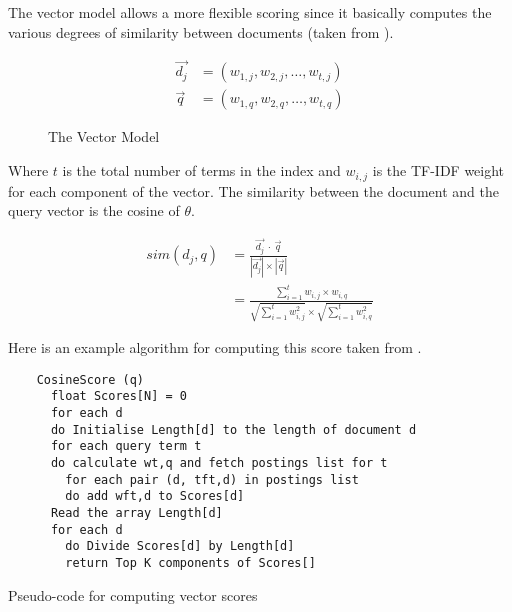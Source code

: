 The vector model allows a more flexible scoring since it basically computes the various degrees of similarity between documents (taken from \autocite[p.78]{Baeza-Yates2011}).

\begin{equation}
  \begin{split}
  \vec{d_j} &= (w_{1,j}, w_{2,j}, \ldots, w_{t,j})\\
  \vec{q} &= (w_{1,q}, w_{2,q}, \ldots, w_{t,q})
  \end{split}
  \label{eq:vector}
\end{equation}

\begin{figure}[htb] %
  \centering
\caption[Vector Model]{The Vector Model}
\label{fig:VM}
\end{figure}

Where $t$ is the total number of terms in the index and $w_{i,j}$ is the TF-IDF weight for each component of the vector. The similarity between the document and the query vector is the cosine of $\theta$.

\begin{equation}
  \begin{split}
  sim(d_j,q) &= \frac{\vec{d_j} \ \cdot \ \vec{q}}{|\vec{d_j}| \times |\vec{q}|}\\
  &= \frac{\sum_{i=1}^{t}w_{i,j} \times w_{i,q}}
  {\sqrt{\sum_{i=1}^{t}w_{i,j}^{2}} \times \sqrt{\sum_{i=1}^{t}w_{i,q}^{2}}}
  \end{split}
  \label{eq:sim2}
\end{equation}

Here is an example algorithm for computing this score taken from \autocite[p.125]{Manning2009}.

\begin{listing}[htb]
  \begin{verbatim}
    CosineScore (q)
      float Scores[N] = 0
      for each d
      do Initialise Length[d] to the length of document d
      for each query term t
      do calculate wt,q and fetch postings list for t
        for each pair (d, tft,d) in postings list
        do add wft,d to Scores[d]
      Read the array Length[d]
      for each d
      	do Divide Scores[d] by Length[d]
      	return Top K components of Scores[]
  \end{verbatim}
\caption[Pseudo-code for computing vector scores]{Pseudo-code for computing vector scores}
\label{code:VectorScores}
\end{listing}

